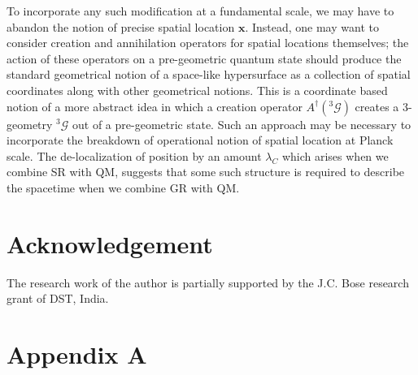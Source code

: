 \documentclass[12pt]{article}
\begin{document}
To incorporate any such modification at a fundamental scale, we may have to abandon the notion of  precise spatial location $\bm{x}$. 
Instead, one may want to consider creation and annihilation operators for spatial locations themselves; the action of these operators on a pre-geometric quantum state should produce the standard geometrical notion of a space-like hypersurface as a collection of spatial coordinates along with other geometrical notions. This is a coordinate based notion of a more abstract idea in which a creation operator $A^\dagger({}^3\mathcal{G})$ creates a 3-geometry ${}^3\mathcal{G}$ out of a pre-geometric state. Such an approach may be necessary to incorporate the breakdown of operational notion of spatial location at Planck scale. The de-localization of position by an amount $\lambda_C$ which arises when we combine SR with QM, suggests that some such structure is required to describe the spacetime when we combine GR with QM. 



\section*{Acknowledgement}
The research work of the author is partially supported by the J.C. Bose research grant of DST, India.



\appendix

\section{Appendix A}
\label{sec:appencompo}
\end{document}
